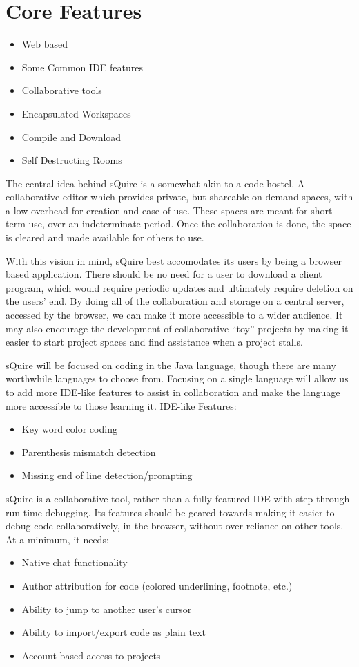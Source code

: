 \documentclass[11pt]{report}
\begin{document}
\section{Core Features}
    \begin{itemize}
      \item Web based
      \item Some Common IDE features
      \item Collaborative tools
      \item Encapsulated Workspaces
      \item Compile and Download
      \item Self Destructing Rooms
    \end{itemize}
    The central idea behind sQuire is a somewhat akin to a code hostel. A collaborative editor which provides private, but shareable on demand spaces, with a low overhead for creation and ease of use. These spaces are meant for short term use, over an indeterminate period. Once the collaboration is done, the space is cleared and made available for others to use.
    
    With this vision in mind, sQuire best accomodates its users by being a browser based application. There should be no need for a user to download a client program, which would require periodic updates and ultimately require deletion on the users' end. By doing all of the collaboration and storage on a central server, accessed by the browser, we can make it more accessible to a wider audience. It may also encourage the development of collaborative ``toy'' projects by making it easier to start project spaces and find assistance when a project stalls.
    
    sQuire will be focused on coding in the Java language, though there are many worthwhile languages to choose from. Focusing on a single language will allow us to add more IDE-like features to assist in collaboration and make the language more accessible to those learning it.
    IDE-like Features:
    \begin{itemize}
      \item Key word color coding
      \item Parenthesis mismatch detection
      \item Missing end of line detection/prompting
    \end{itemize}
    
    sQuire is a collaborative tool, rather than a fully featured IDE with step through run-time debugging. Its features should be geared towards making it easier to debug code collaboratively, in the browser, without over-reliance on other tools. At a minimum, it needs:
    \begin{itemize}
      \item Native chat functionality
      \item Author attribution for code (colored underlining, footnote, etc.)
      \item Ability to jump to another user's cursor
      \item Ability to import/export code as plain text
      \item Account based access to projects
    \end{itemize}
    
\end{document}
